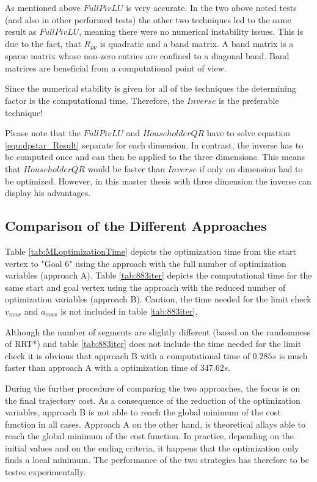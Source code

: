 As mentioned above $FullPivLU$ is very accurate. In the two above noted tests (and also in other performed tests) the other two techniques led to the same result as $FullPivLU$, meaning there were no numerical instability issues. This is due to the fact, that $R_{pp}$ is quadratic and a band matrix. A band matrix is a sparse matrix whose non-zero entries are confined to a diagonal band. Band matrices are beneficial from a computational point of view. \newline

Since the numerical stability is given for all of the techniques the determining factor is the computational time. Therefore, the $Inverse$ is the preferable technique! \newline

Please note that the $FullPivLU$ and $HouseholderQR$ have to solve equation \ref{equ:dpstar_Result} separate for each dimension. In contrast, the inverse has to be computed once and can then be applied to the three dimensions. This means that $HouseholderQR$ would be faster than $Inverse$ if only on dimension had to be optimized. However, in this master thesis with three dimension the inverse can display his advantages.


\subsection{Comparison of the Different Approaches}\label{sec:CompDiffApp}

Table \ref{tab:MLoptimizationTime} depicts the optimization time from the start vertex to "Goal 6" using the approach with the full number of optimization variables (approach A). Table \ref{tab:883iter} depicts the computational time for the same start and goal vertex using the approach with the reduced number of optimization variables (approach B). Caution, the time needed for the limit check $v_{max}$ and $a_{max}$ is not included in table \ref{tab:883iter}. \newline 

Although the number of segments are slightly different (based on the randomness of RRT*) and table \ref{tab:883iter} does not include the time needed for the limit check it is obvious that approach B with a computational time of $0.285s$ is much faster than approach A with a optimization time of $347.62s$.\newline 


During the further procedure of comparing the two approaches, the focus is on the final trajectory cost.
As a consequence of the reduction of the optimization variables, approach B is not able to reach the global minimum of the cost function in all cases. Approach A on the other hand, is theoretical allays able to reach the global minimum of the cost function. In practice, depending on the initial values and on the ending criteria, it happens that the optimization only finds a local minimum. The performance of the two strategies has therefore to be testes experimentally. \newpage

